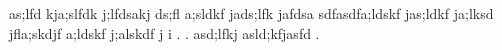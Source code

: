 as;lfd kja;slfdk j;lfdsakj ds;fl   a;sldkf
jads;lfk jafdsa sdfasdfa;ldskf jas;ldkf ja;lksd
jfla;skdjf  a;ldskf j;alskdf j i . . asd;lfkj
asld;kfjasfd   .



